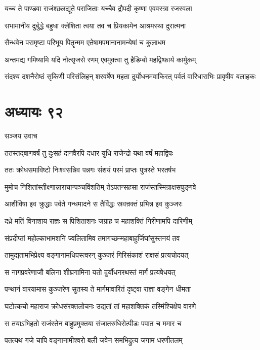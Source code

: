 \twolineshloka
{यच्च ते पाण्डवा राजंश्छलद्यूते पराजिताः}
{यच्चैव द्रौपदी कृष्णा एववस्त्रा रजस्वला}


\twolineshloka
{सभामानीय दुर्बुद्धे बहुधा क्लेशिता त्वया}
{तव च प्रियकामेन आश्रमस्था दुरात्मना}


\twolineshloka
{सैन्धवेन परामृष्टा परिभूय पितॄन्मम}
{एतेषामपमानानामन्येषां च कुलाधम}


\twolineshloka
{अन्तमद्य गमिष्यामि यदि नोत्सृजसे रणम्}
{एवमुक्त्वा तु हैडिम्बो महद्विष्फार्य कार्मुकम्}


\threelineshloka
{संदश्य दशनैरोष्ठं सृकिणी परिसंलिहन्}
{शरवर्षेण महता दुर्योधनमवाकिरत्}
{पर्वतं वारिधाराभिः प्रावृषीव बलाहकः}


\chapter{अध्यायः ९२}
\twolineshloka
{सञ्जय उवाच}
{}


\twolineshloka
{ततस्तद्बाणवर्षं तु दुःसहं दानवैरपि}
{दधार युधि राजेन्द्रो यथा वर्षं महाद्विपः}


\twolineshloka
{ततः क्रोधसमाविष्टो निःश्वसन्निव पन्नगः}
{संशयं परमं प्राप्तः पुत्रस्ते भरतर्षभ}


\twolineshloka
{मुमोच निशितांस्तीक्ष्णान्नाराचान्पञ्चविंशतिम्}
{तेऽपतन्सहसा राजंस्तस्मिन्राक्षसपुङ्गवे}


\twolineshloka
{आशीविषा इव क्रुद्धाः पर्वते गन्धमादने}
{स तैर्विद्धः स्रवन्रक्तं प्रभिन्न इव कुञ्जरः}


\twolineshloka
{दध्रे मतिं विनाशाय राज्ञः स पिशिताशनः}
{जग्राह च महाशक्तिं गिरीणामपि दारिणीम्}


\twolineshloka
{संप्रदीप्तां महोल्काभामशनिं ज्वलितामिव}
{तमागच्छन्महाबाहुर्जिघांसुस्तनयं तव}


\twolineshloka
{तामुद्यतामभिप्रेक्ष्य वङ्गानामधिपस्त्वरन्}
{कुञ्जरं गिरिसंकाशं राक्षसं प्रत्यचोदयत्}


\twolineshloka
{स नागप्रवरेणाजौ बलिना शीघ्रगामिना}
{यतो दुर्योधनरथस्तं मार्गं प्रत्यषेधयत्}


\twolineshloka
{पन्थानं वारयामास कुञ्जरेण सुतस्य ते}
{मार्गमावारितं दृष्ट्वा राज्ञा वङ्गेन धीमता}


\twolineshloka
{घटोत्कचो महाराज क्रोधसंरक्तलोचनः}
{उद्यतां तां महाशक्तिकं तस्मिंश्चिक्षेप वारणे}


\twolineshloka
{स तयाऽभिहतो राजंस्तेन बाहुप्रमुक्तया}
{संजातरुधिरोत्पीडः पपात च ममार च}


\twolineshloka
{पतत्यथ गजे चापि वङ्गानामीश्वरो बली}
{जवेन समभिद्रुत्य जगाम धरणीतलम्}


